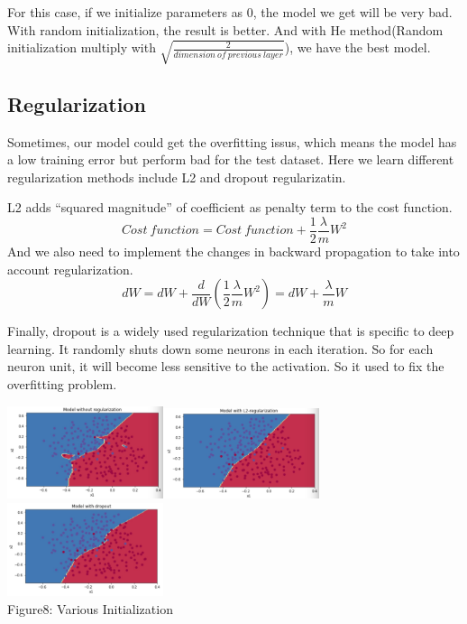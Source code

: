 \documentclass[a4paper]{article}
\begin{document}
For this case, if we initialize parameters as 0, the model we get will be very bad. With random initialization, the result is better. And with He method(Random initialization multiply with $\sqrt{\frac{2}{dimension\ of\ previous\ layer}}$), we have the best model.

\subsection{Regularization}

Sometimes, our model could get the overfitting issus, which means the model has a low training error but perform bad for the test dataset. Here we learn different regularization methods include L2 and dropout regularizatin. 

L2 adds “squared magnitude” of coefficient as penalty term to the cost function. 
$$Cost\ function = Cost\ function+ \frac{1}{2} \frac{\lambda}{m}W^2$$
And we also need to implement the changes in backward propagation to take into account regularization.
$$dW=dW+\frac{d}{dW}(\frac{1}{2} \frac{\lambda}{m}W^2)=dW+\frac{\lambda}{m}W$$

Finally, dropout is a widely used regularization technique that is specific to deep learning. It randomly shuts down some neurons in each iteration. So for each neuron unit, it will become less sensitive to the activation. So it used to fix the overfitting problem.

\begin{center}
\includegraphics[width=1.8in]{nore.png}\includegraphics[width=1.8in]{l2.png}\includegraphics[width=1.8in]{drop.png}\\
Figure8: Various Initialization
\end{center}
\end{document}
